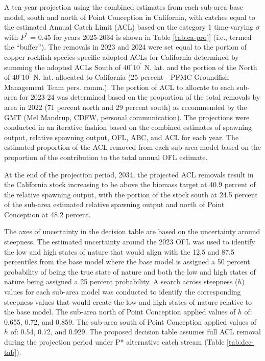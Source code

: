 \documentclass[11pt,
  letterpaper,
]{article}
\begin{document}
A ten-year projection using the combined estimates from each sub-area base model, south and north of Point Conception in California, with catches equal to the estimated Annual Catch Limit (ACL) based on the category 1 time-varying \(\sigma\) with \(P^*\) = 0.45 for years 2025-2034 is shown in Table \ref{tab:ca-proj} (i.e., termed the ``buffer''). The removals in 2023 and 2024 were set equal to the portion of copper rockfish species-specific adopted ACLs for California determined by summing the adopted ACLs South of $40^\circ 10^\prime$ N. lat. and the portion of the North of $40^\circ 10^\prime$ N. lat. allocated to California (25 percent - PFMC Groundfish Management Team pers. comm.). The portion of ACL to allocate to each sub-area for 2023-24 was determined based on the proportion of the total removals by area in 2022 (71 percent north and 29 percent south) as recommended by the GMT (Mel Mandrup, CDFW, personal communication). The projections were conducted in an iterative fashion based on the combined estimates of spawning output, relative spawning output, OFL, ABC, and ACL for each year. The estimated proportion of the ACL removed from each sub-area model based on the proportion of the contribution to the total annual OFL estimate.

At the end of the projection period, 2034, the projected ACL removals result in the California stock increasing to be above the biomass target at 40.9 percent of the relative spawning output, with the portion of the stock south at 24.5 percent of the sub-area estimated relative spawning output and north of Point Conception at 48.2 percent.

The axes of uncertainty in the decision table are based on the uncertainty around steepness. The estimated uncertainty around the 2023 OFL was used to identify the low and high states of nature that would align with the 12.5 and 87.5 percentiles from the base model where the base model is assigned a 50 percent probability of being the true state of nature and both the low and high states of nature being assigned a 25 percent probability. A search across steepness (\(h\)) values for each sub-area model was conducted to identify the corresponding steepness values that would create the low and high states of nature relative to the base model. The sub-area north of Point Conception applied values of \(h\) of: 0.655, 0.72, and 0.859. The sub-area south of Point Conception applied values of \(h\) of: 0.54, 0.72, and 0.929. The proposed decision table assumes full ACL removal during the projection period under P* alternative catch stream (Table \ref{tab:dec-tab}).
\end{document}
